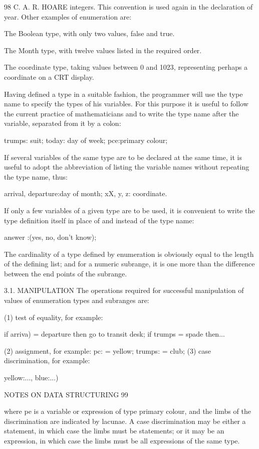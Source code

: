 98 C. A. R. HOARE integers. This convention is used again in the declaration of year. Other examples of enumeration are:

The Boolean type, with only two values, false and true.

The Month type, with twelve values listed in the required order.

The coordinate type, taking values between 0 and 1023, representing perhaps a coordinate on a CRT display.

Having defined a type in a suitable fashion, the programmer will use the type name to specify the types of his variables. For this purpose it is useful to follow the current practice of mathematicians and to write the type name after the variable, separated from it by a colon:

trumps: suit; today: day of week; pce:primary colour;

If several variables of the same type are to be declared at the same time, it is useful to adopt the abbreviation of listing the variable names without repeating the type name, thus:

arrival, departure:day of month; xX, y, z: coordinate.

If only a few variables of a given type are to be used, it is convenient to write the type definition itself in place of and instead of the type name:

answer :(yes, no, don’t know);

The cardinality of a type defined by enumeration is obviously equal to the length of the defining list; and for a numeric subrange, it is one more than the difference between the end points of the subrange.

3.1. MANIPULATION The operations required for successful manipulation of values of enumeration types and subranges are:

(1) test of equality, for example:

if arriva) = departure then go to transit desk; if trumps = spade then...

(2) assignment, for example: pc: = yellow; trumps: = club; (3) case discrimination, for example:

yellow:..., blue:...)

NOTES ON DATA STRUCTURING 99

where pe is a variable or expression of type primary colour, and the limbs of the discrimination are indicated by lacunae. A case discrimination may be either a statement, in which case the limbs must be statements; or it may be an expression, in which case the limbs must be all expressions of the same type.

